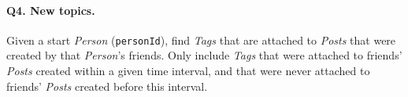 \paragraph{\textbf{Q4}. New topics.}
Given a start \emph{Person} (\texttt{personId}), find \emph{Tags} that
are attached to \emph{Posts} that were created by that \emph{Person}'s
friends. Only include \emph{Tags} that were attached to friends'
\emph{Posts} created within a given time interval, and that were never
attached to friends' \emph{Posts} created before this interval.
